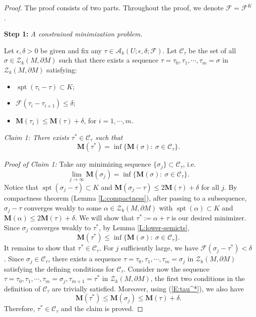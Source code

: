 \documentclass[10pt]{amsart}
\theoremstyle{definition}
\theoremstyle{remark}
\numberwithin{equation}{section}
\newcommand{\al}{\alpha}
\newcommand{\F}{\mathcal{F}}
\newcommand{\C}{\mathcal{C}}
\newcommand{\si}{\sigma}
\newcommand{\de}{\delta}
\newcommand{\ep}{\epsilon}
\newcommand{\Z}{\mathcal{Z}}
\newcommand{\M}{\mathbf{M}}
\newcommand{\sA}{\mathscr{A}}
\newcommand{\spt}{\operatorname{spt}}
\begin{document}
\begin{proof}
The proof consists of two parts. Throughout the proof, we denote $\F=\F^K$.

\vspace{0.3cm}
\noindent \textbf{Step 1:} \textit{A constrained minimization problem.}
\vspace{0.3cm}

Let $\ep, \de>0$ be given and fix any $\tau \in \sA_k(U;\ep,\de;\F)$. Let $\C_{\tau}$ be the set of all $\si \in \Z_k(M, \partial M)$ such that there exists a sequence $\tau=\tau_0, \tau_1, \cdots, \tau_m=\si$ in $\Z_k(M, \partial M)$ satisfying:
 \begin{itemize}
\item $\spt(\tau_i-\tau)\subset K$;
\item $\F(\tau_i - \tau_{i+1})\leq \de$;
\item $\M(\tau_i)\leq \M(\tau)+\de$, for $i=1, \cdots, m$.
\end{itemize}

\textit{Claim 1: There exists $\tau^* \in \C_{\tau}$ such that }
\[ \M(\tau^*)=\inf\{\M(\si):\ \si\in\C_{\tau}\}.\]

\vspace{0.3cm}
\textit{Proof of Claim 1:} Take any minimizing sequence $\{\si_j\}\subset\C_{\tau}$, i.e.
\[ \lim_{j \to \infty} \M(\si_j) = \inf\{\M(\si):\ \si\in\C_{\tau}\}.\]
Notice that $\spt(\si_j-\tau) \subset K$ and $\M(\si_j-\tau) \leq 2 \M(\tau) + \de$ for all $j$. By compactness theorem (Lemma \ref{L:compactness}), after passing to a subsequence, $\si_j-\tau$ converges weakly to some $\al \in\Z_k(M, \partial M)$ with $\spt(\al) \subset K$ and $\M(\al) \leq 2 \M(\tau) + \de$. We will show that $\tau^*:=\al+\tau$ is our desired minimizer. Since $\sigma_j$ converges weakly to $\tau^*$, by Lemma \ref{L:lower-semicts}, 
\begin{equation}
\label{E:tau^*}
\M(\tau^*) \leq  \inf\{\M(\si):\ \si\in\C_{\tau}\}.
\end{equation}
It remains to show that $\tau^*\in \C_{\tau}$. For $j$ sufficiently large, we have $\F(\si_j-\tau^*)<\de$. Since $\sigma_j \in \C_{\tau}$, there exists a sequence $\tau=\tau_0, \tau_1, \cdots, \tau_m=\si_j$ in $\Z_k(M, \partial M)$ satisfying the defining conditions for $\C_{\tau}$. Consider now the sequence $\tau=\tau_0, \tau_1, \cdots, \tau_m=\si_j, \tau_{m+1}=\tau^*$ in $\Z_k(M, \partial M)$, the first two conditions in the definition of $\C_{\tau}$ are trivially satisfied. Moreover, using (\ref{E:tau^*}), we also have
\[ \M(\tau^*)\leq\M(\si_j)\leq\M(\tau)+\de.\]
Therefore, $\tau^*\in\C_{\tau}$ and the claim is proved. 



\end{proof}
\end{document}
